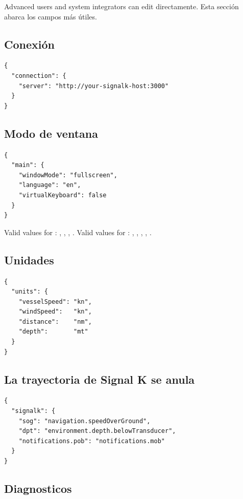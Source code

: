 Advanced users and system integrators can edit 
directamente.
Esta sección abarca los campos más útiles.

\subsection{Conexión}

\begin{lstlisting}
{
  "connection": {
    "server": "http://your-signalk-host:3000"
  }
}
\end{lstlisting}

\subsection{Modo de ventana}

\begin{lstlisting}
{
  "main": {
    "windowMode": "fullscreen",
    "language": "en",
    "virtualKeyboard": false
  }
}
\end{lstlisting}

Valid values for : , ,
, .
Valid values for : , , ,
, .

\subsection{Unidades}

\begin{lstlisting}
{
  "units": {
    "vesselSpeed": "kn",
    "windSpeed":   "kn",
    "distance":    "nm",
    "depth":       "mt"
  }
}
\end{lstlisting}

\subsection{La trayectoria de Signal K se anula}

\begin{lstlisting}
{
  "signalk": {
    "sog": "navigation.speedOverGround",
    "dpt": "environment.depth.belowTransducer",
    "notifications.pob": "notifications.mob"
  }
}
\end{lstlisting}

\subsection{Diagnosticos}

